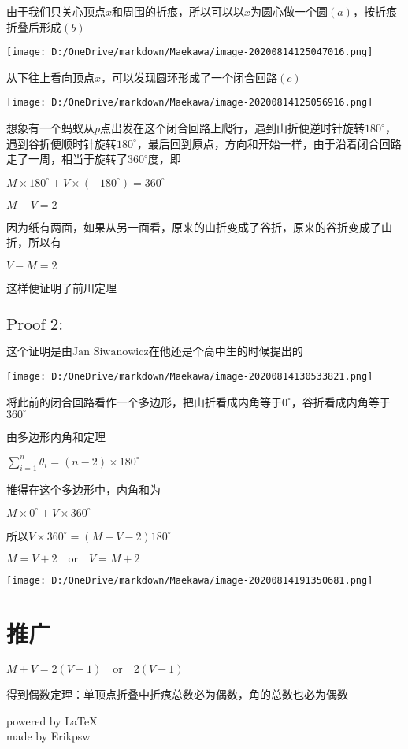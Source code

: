 \documentclass[a4paper,12pt]{article}
\begin{document}
由于我们只关心顶点$x$和周围的折痕，所以可以以$x$为圆心做一个圆$(a)$，按折痕折叠后形成$(b)$\\

\begin{center}
\texttt{[image: D:/OneDrive/markdown/Maekawa/image-20200814125047016.png]}\\
\end{center}

从下往上看向顶点$x$，可以发现圆环形成了一个闭合回路$(c)$

\begin{center}
    \texttt{[image: D:/OneDrive/markdown/Maekawa/image-20200814125056916.png]}
\end{center}


想象有一个蚂蚁从$p$点出发在这个闭合回路上爬行，遇到山折便逆时针旋转$180^{\circ}$，遇到谷折便顺时针旋转$180^{\circ}$，最后回到原点，方向和开始一样，由于沿着闭合回路走了一周，相当于旋转了$360^{\circ}$度，即

$M \times 180^{\circ} +V \times (-180^{\circ}) = 360^{\circ}$

$M - V = 2$

因为纸有两面，如果从另一面看，原来的山折变成了谷折，原来的谷折变成了山折，所以有

$V - M = 2$

这样便证明了前川定理

\subsection{$\text{Proof}\;2:$}

这个证明是由$\text{Jan Siwanowicz}$在他还是个高中生的时候提出的
\begin{center}
\texttt{[image: D:/OneDrive/markdown/Maekawa/image-20200814130533821.png]}\\
\end{center}

将此前的闭合回路看作一个多边形，把山折看成内角等于$0^{\circ}$，谷折看成内角等于$360^{\circ}$

由多边形内角和定理

$\sum\limits_{i=1}^n\theta_i=(n-2)×180^{\circ}$

推得在这个多边形中，内角和为

$M \times 0^{\circ} +V \times 360^{\circ}$

所以$V\times 360^{\circ} = (M +V-2)180^{\circ}$

$ M = V +2 \quad \text{or}\quad V = M + 2$
\begin{center}
\texttt{[image: D:/OneDrive/markdown/Maekawa/image-20200814191350681.png]}\\
\end{center}

\section{推广}

$M + V = 2(V+1) \quad \text{or} \quad2(V- 1)$

得到偶数定理：单顶点折叠中折痕总数必为偶数，角的总数也必为偶数
\begin{flushright}
    powered by \LaTeX\\
    made by Erikpsw\\ 
\end{flushright}



\end{document}
